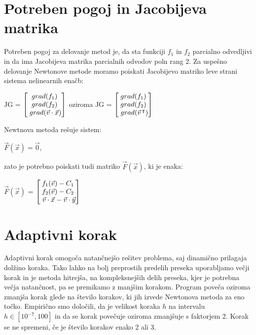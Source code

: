 \documentclass[12pt]{article}
\begin{document}
	\newpage	
	\section{Potreben pogoj in Jacobijeva matrika}
	Potreben pogoj za delovanje metod je, da sta funkciji $f_{1}$ in $f_{2}$ parcialno odvedljivi in da ima Jacobijeva matrika parcialnih odvodov poln rang 2. Za uspešno delovanje Newtonove metode moramo poiskati Jacobijevo matriko leve strani sistema nelinearnih enačb:
	
	\begin{center}
		JG = $\begin{bmatrix}
		grad(f_{1}) \\
		grad(f_{2}) \\
		\hspace{1mm}grad(\vec{v} \cdot \vec{x}) \\
		\end{bmatrix}$
		oziroma
		JG = $\begin{bmatrix}
		grad(f_{1}) \\
		grad(f_{2}) \\
		\hspace{1mm}grad(\vec{v}\hspace{0.5mm}^\intercal) \\
		\end{bmatrix}$
	\end{center}
	Newtnova metoda rešuje sistem:
	\begin{center}
		$\vec{F}(\vec{x}) = \vec{0}$,
	\end{center}
	zato je potrebno poiskati tudi matriko $\vec{F}(\vec{x})$, ki je enaka:
	\begin{center}
		$\vec{F}(\vec{x})$ = $\begin{bmatrix}
		f_{1}(\vec{v}) - C_{1} \\
		f_{2}(\vec{v}) - C_{2} \\
		\hspace{1mm}\vec{v} \cdot \vec{x} - \vec{v} \cdot \vec{y} \\
		\end{bmatrix}$
	\end{center}
	
	\section{Adaptivni korak}
	Adaptivni korak omogoča natančnejšo rešitev problema, saj dinamično prilagaja dolžino koraka. Tako lahko na bolj preprostih predelih preseka uporabljamo večji korak in je metoda hitrejša, na kompleksnejših delih preseka, kjer je potrebna večja natančnost, pa se premikamo z manjšim korakom. Program poveča oziroma zmanjša korak glede na število korakov, ki jih izvede Newtonova metoda za eno točko. Empirično smo določili, da je velikost koraka $h$ na intervalu $h\in[10^{-7},100]$ in da se korak povečuje oziroma zmanjšuje s faktorjem 2. Korak se ne spremeni, če je število korakov enako 2 ali 3.
	
\end{document}
